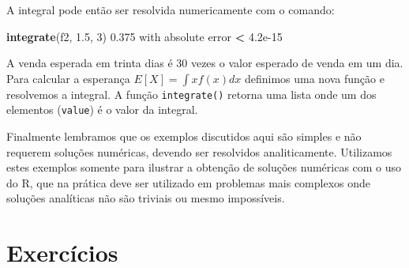 \documentclass[10pt,a4paper]{book}
\newenvironment{Shaded}{\begin{snugshade}}{\end{snugshade}}
\newcommand{\KeywordTok}[1]{\textcolor[rgb]{0.13,0.29,0.53}{\textbf{#1}}}
\newcommand{\DecValTok}[1]{\textcolor[rgb]{0.00,0.00,0.81}{#1}}
\newcommand{\FloatTok}[1]{\textcolor[rgb]{0.00,0.00,0.81}{#1}}
\newcommand{\StringTok}[1]{\textcolor[rgb]{0.31,0.60,0.02}{#1}}
\newcommand{\ControlFlowTok}[1]{\textcolor[rgb]{0.13,0.29,0.53}{\textbf{#1}}}
\newcommand{\OperatorTok}[1]{\textcolor[rgb]{0.81,0.36,0.00}{\textbf{#1}}}
\newcommand{\NormalTok}[1]{#1}
\begin{document}
A integral pode então ser resolvida numericamente com o comando:

\begin{Shaded}
\begin{Highlighting}[]
\KeywordTok{integrate}\NormalTok{(f2, }\FloatTok{1.5}\NormalTok{, }\DecValTok{3}\NormalTok{)}
\FloatTok{0.375}\NormalTok{ with absolute error }\OperatorTok{<}\StringTok{ }\FloatTok{4.2e-15}
\end{Highlighting}
\end{Shaded}

A venda esperada em trinta dias é 30 vezes o valor esperado de venda em
um dia. Para calcular a esperança \(E[X] = \int x f(x) dx\) definimos
uma nova função e resolvemos a integral. A função \texttt{integrate()}
retorna uma lista onde um dos elementos (\texttt{value}) é o valor da
integral.

\begin{Shaded}
\end{Shaded}

Finalmente lembramos que os exemplos discutidos aqui são simples e não
requerem soluções numéricas, devendo ser resolvidos analiticamente.
Utilizamos estes exemplos somente para ilustrar a obtenção de soluções
numéricas com o uso do R, que na prática deve ser utilizado em problemas
mais complexos onde soluções analíticas não são triviais ou mesmo
impossíveis.

\section*{Exercícios}\label{exercicios-13}
\end{document}
